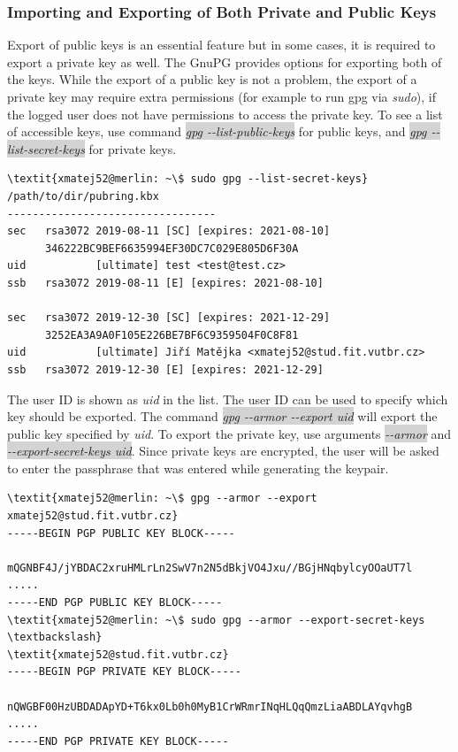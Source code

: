 \subsubsection*{Importing and Exporting of Both Private and Public Keys}
\label{text:keysExport}
Export of public keys is an essential feature but in some cases, it is required to export a private key as well. The GnuPG provides options for exporting both of the keys. While the export of a public key is not a problem, the export of a private key may require extra permissions (for example to run gpg via \textit{sudo}), if the logged user does not have permissions to access the private key. To see a list of accessible keys, use command \colorbox{lightgray}{\textit{gpg -{}-list-public-keys}} for public keys, and \colorbox{lightgray}{\textit{gpg -{}-list-secret-keys}} for private keys. 
\begin{Verbatim}[commandchars=\\\{\},codes={\catcode`$=3\catcode`_=8},samepage=false,frame=single]
\textit{xmatej52@merlin: ~\$ sudo gpg --list-secret-keys}
/path/to/dir/pubring.kbx
---------------------------------
sec   rsa3072 2019-08-11 [SC] [expires: 2021-08-10]
      346222BC9BEF6635994EF30DC7C029E805D6F30A
uid           [ultimate] test <test@test.cz>
ssb   rsa3072 2019-08-11 [E] [expires: 2021-08-10]

sec   rsa3072 2019-12-30 [SC] [expires: 2021-12-29]
      3252EA3A9A0F105E226BE7BF6C9359504F0C8F81
uid           [ultimate] Jiří Matějka <xmatej52@stud.fit.vutbr.cz>
ssb   rsa3072 2019-12-30 [E] [expires: 2021-12-29]
\end{Verbatim}

The user ID is shown as \textit{uid} in the list. The user ID can be used to specify which key should be exported. The command \colorbox{lightgray}{\textit{gpg -{}-armor -{}-export uid}} will export the public key specified by \textit{uid}. To export the private key, use arguments \colorbox{lightgray}{\textit{-{}-armor}} and \\  \colorbox{lightgray}{\textit{-{}-export-secret-keys uid}}. Since private keys are encrypted, the user will be asked to enter the passphrase that was entered while generating the keypair.
\begin{Verbatim}[commandchars=\\\{\},codes={\catcode`$=3\catcode`_=8},samepage=false,frame=single]
\textit{xmatej52@merlin: ~\$ gpg --armor --export xmatej52@stud.fit.vutbr.cz}
-----BEGIN PGP PUBLIC KEY BLOCK-----

mQGNBF4J/jYBDAC2xruHMLrLn2SwV7n2N5dBkjVO4Jxu//BGjHNqbylcyOOaUT7l
.....
-----END PGP PUBLIC KEY BLOCK-----
\textit{xmatej52@merlin: ~\$ sudo gpg --armor --export-secret-keys \textbackslash}
\textit{xmatej52@stud.fit.vutbr.cz}
-----BEGIN PGP PRIVATE KEY BLOCK-----

nQWGBF00HzUBDADApYD+T6kx0Lb0h0MyB1CrWRmrINqHLQqQmzLiaABDLAYqvhgB
.....
-----END PGP PRIVATE KEY BLOCK-----
\end{Verbatim}

